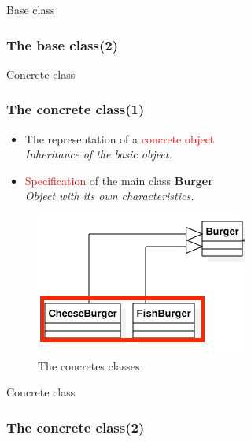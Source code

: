 \documentclass{beamer}
\begin{document}
  \begin{frame}{Base class}
    \frametitle{The base class(2)}
    
  \end{frame}

  \begin{frame}{Concrete class}
    \frametitle{The concrete class(1)}
    \begin{itemize}
      \item The representation of a \textcolor{red}{concrete object} \\
      \textit{Inheritance of the basic object.}
      \item \textcolor{red}{Specification} of the main class \textbf{Burger} \\
      \textit{Object with its own characteristics.}
    \end{itemize}
    \begin{figure}[!b]
      \centering
      \includegraphics[scale=0.4]{concrete}
      \caption{The concretes classes}
    \end{figure}
  \end{frame}

  \begin{frame}{Concrete class}
    \frametitle{The concrete class(2)}
    
  \end{frame}
\end{document}
